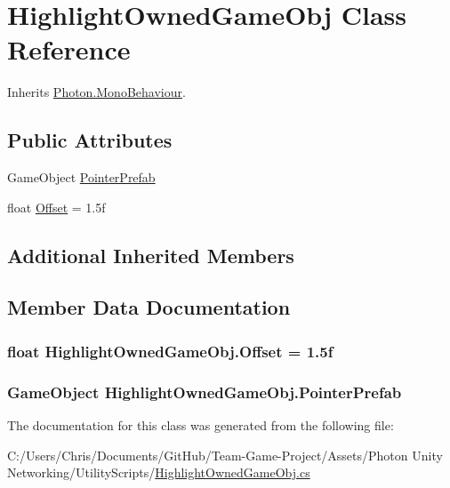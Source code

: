 \hypertarget{class_highlight_owned_game_obj}{}\section{Highlight\+Owned\+Game\+Obj Class Reference}
\label{class_highlight_owned_game_obj}


Inherits \hyperlink{class_photon_1_1_mono_behaviour}{Photon.\+Mono\+Behaviour}.

\subsection*{Public Attributes}
\begin{DoxyCompactItemize}
\item 
Game\+Object \hyperlink{class_highlight_owned_game_obj_ad94db2e57c7b1b7d66dc1744f7571362}{Pointer\+Prefab}
\item 
float \hyperlink{class_highlight_owned_game_obj_a627640117867653ad7baf37c1b390e33}{Offset} = 1.\+5f
\end{DoxyCompactItemize}
\subsection*{Additional Inherited Members}


\subsection{Member Data Documentation}
\subsubsection[{\texorpdfstring{Offset}{Offset}}]{\setlength{\rightskip}{0pt plus 5cm}float Highlight\+Owned\+Game\+Obj.\+Offset = 1.\+5f}\hypertarget{class_highlight_owned_game_obj_a627640117867653ad7baf37c1b390e33}{}\label{class_highlight_owned_game_obj_a627640117867653ad7baf37c1b390e33}
\subsubsection[{\texorpdfstring{Pointer\+Prefab}{PointerPrefab}}]{\setlength{\rightskip}{0pt plus 5cm}Game\+Object Highlight\+Owned\+Game\+Obj.\+Pointer\+Prefab}\hypertarget{class_highlight_owned_game_obj_ad94db2e57c7b1b7d66dc1744f7571362}{}\label{class_highlight_owned_game_obj_ad94db2e57c7b1b7d66dc1744f7571362}


The documentation for this class was generated from the following file\+:\begin{DoxyCompactItemize}
\item 
C\+:/\+Users/\+Chris/\+Documents/\+Git\+Hub/\+Team-\/\+Game-\/\+Project/\+Assets/\+Photon Unity Networking/\+Utility\+Scripts/\hyperlink{_highlight_owned_game_obj_8cs}{Highlight\+Owned\+Game\+Obj.\+cs}\end{DoxyCompactItemize}
